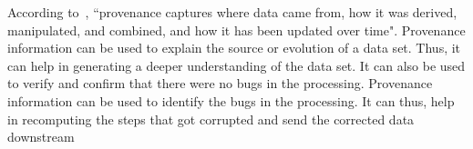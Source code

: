 According to~\cite{Ikeda:2010:PSP:1855795.1855800}, ``provenance captures where data came from, how it was derived, manipulated, and combined, and how it has been updated over time". Provenance information can be used to explain the source or evolution of a data set. Thus, it can help in generating a deeper understanding of the data set. It can also be used to verify and confirm that there were no bugs in the processing. Provenance information can be used to identify the bugs in the processing. It can thus, help in recomputing the steps that got corrupted and send the corrected data downstream~\cite{Ikeda:2010:PSP:1855795.1855800}
